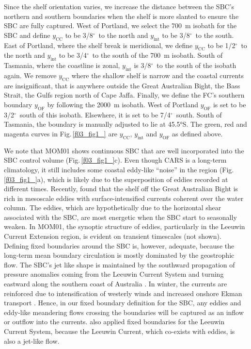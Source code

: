 \documentclass[preprint,3p,review,12pt]{elsarticle}
\newcommand{\SIadj}[2]{\SI[number-unit-product={\text{-}}]{#1}{#2}}
\newcommand{\dg}{$^{\circ}$}
\newcommand{\sub}[1]{_{\text{#1}}}
\begin{document}
Since the shelf orientation varies, we increase the distance between the SBC's northern and southern boundaries when the shelf is more slanted to ensure the SBC are fully captured. West of Portland, we select the \SIadj{700}{\meter} isobath for the SBC and define $y\sub{CC}$ to be 3/8\dg~to the north and $y\sub{int}$ to be 3/8\dg~to the south. East of Portland, where the shelf break is meridional, we define $y\sub{CC}$ to be 1/2\dg~to the north and $y\sub{int}$ to be 3/4\dg~to the south of the \SIadj{700}{\meter} isobath. South of Tasmania, where the coastline is zonal, $y\sub{int}$ is 3/8\dg~to the south of the isobath again.
We remove $y\sub{CC}$ where the shallow shelf is narrow and the coastal currents are insignificant, that is anywhere outside the Great Australian Bight, the Bass Strait, the Gulfs region north of Cape Jaffa. Finally, we define the FC's southern boundary $y\sub{OF}$ by following the \SIadj{2000}{\meter} isobath. West of Portland $y\sub{OF}$ is set to be 3/2\dg~south of this isobath. Elsewhere, it is set to be 7/4\dg~south. South of Tasmania, the boundary is manually adjusted to lie at \ang{45.5}S.
The green, red and magenta curves in Fig.\,\ref{f03_fig1_} are $y\sub{CC}$, $y\sub{int}$ and $y\sub{OF}$ as defined above.

We note that MOM01 shows continuous SBC that are well incorporated into the SBC control volume (Fig.\,\ref{f03_fig1_}c). Even though CARS is a long-term climatology, it still includes some coastal eddy-like ``noise'' in the region (Fig.\,\ref{f03_fig1_}a), which is likely due to the superposition of eddies recorded at different times. Recently, \citet{Oke2018} found that the shelf off the Great Australian Bight is rich in mesoscale eddies with surface-intensified currents coherent over the water column. The eddies, which are hypothetically due to the horizontal shear associated with the SBC, are most energetic when the SBC start to seasonally weaken. In MOM01, the synoptic structure of eddies, particularly in the Leeuwin Current Extension region, is evident on transient timescales (not shown). Defining fixed boundaries around the SBC is, however, adequate, because the long-term mean boundary circulation is mostly dominated by the geostrophic flow. The SBC's jet like shape is maintained by the southward propagation of pressure anomalies coming from the Leeuwin Current System and turning eastward along the southern coast of Australia \citep{Middleton2007, Ridgway2015}. In winter, the currents are reinforced due to intensification of westerly winds and increased onshore Ekman transport \citep{Ridgway2004}. Hence, in our fixed boundary definition for the SBC, any eddies and eddy-like meandering flows crossing the boundaries will be captured as an inflow or outflow into the currents. \citet{Furue2017} also applied fixed boundaries for the Leeuwin Current System, because the Leeuwin Current, which co-exists with eddies, is also a jet-like flow.
\end{document}
